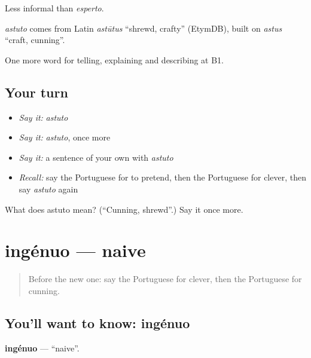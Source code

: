 Less informal than \emph{esperto}.

\begin{cousinweb}
\emph{astuto} comes from Latin \emph{astūtus} \textquotedblleft{}shrewd, crafty\textquotedblright{} (EtymDB), built on \emph{astus} \textquotedblleft{}craft, cunning\textquotedblright{}.
\end{cousinweb}

\begin{grammarlens}[title={What you've built}]
One more word for telling, explaining and describing at B1.
\end{grammarlens}

\subsection*{Your turn}
\begin{itemize}
\raggedright
  \item \emph{Say it:} \emph{astuto}
  \item \emph{Say it:} \emph{astuto}, once more
  \item \emph{Say it:} a sentence of your own with \emph{astuto}
  \item \emph{Recall:} say the Portuguese for to pretend, then the Portuguese for clever, then say \emph{astuto} again
\end{itemize}

\begin{tcolorbox}[breakable,colback=teal!4,colframe=teal!35!black,title={Before you move on}]
What does astuto mean? (\textquotedblleft{}Cunning, shrewd\textquotedblright{}.) Say it once more.
\end{tcolorbox}
\section[ingénuo]{ingénuo — naive}

\label{lesson:PT-C472-ingenuo}



\begin{quote}
Before the new one: say the Portuguese for clever, then the Portuguese for cunning.
\end{quote}

\subsection*{You'll want to know: ingénuo}
\textbf{ingénuo} — \textquotedblleft{}naive\textquotedblright{}.

